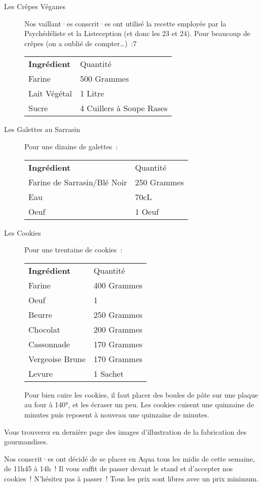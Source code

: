 \begin{description}
	\item[Les Crêpes Véganes] Nos vaillant·es conscrit·es ont utilisé la recette employée par la Psychédéliste et la Listeception (et donc les \cof{} 23 et 24). Pour beaucoup de crêpes (on a oublié de compter\dots)~:7

		\begin{tabular}{ll}
			\bf Ingrédient & Quantité\\
			Farine & 500 Grammes\\
			Lait Végétal & 1 Litre\\
			Sucre & 4 Cuillers à Soupe Rases\\
		\end{tabular}

	\item[Les Galettes au Sarrasin] Pour une dizaine de galettes~: 

		\begin{tabular}{ll}
			\bf Ingrédient & Quantité\\
			Farine de Sarrasin/Blé Noir & 250 Grammes\\
			Eau & 70cL\\
			Oeuf & 1 Oeuf\\
		\end{tabular}

	\item[Les Cookies] Pour une trentaine de cookies~:

		\begin{tabular}{ll}
			\bf Ingrédient & Quantité\\
			Farine & 400 Grammes\\
			Oeuf & 1\\
			Beurre & 250 Grammes\\
			Chocolat & 200 Grammes\\
			Cassonnade & 170 Grammes\\
			Vergeoise Brune & 170 Grammes\\
			Levure & 1 Sachet\\
		\end{tabular}
	Pour bien cuire les cookies, il faut placer des boules de pâte sur une plaque au four à 140°, et les écraser un peu. Les cookies cuisent une quinzaine de minutes puis reposent à nouveau une quinzaine de minutes.
\end{description}

Vous trouverez en dernière page des images d'illustration de la fabrication des gourmandises.

Nos conscrit·es ont décidé de se placer en Aqua tous les midis de cette semaine, de 11h45 à 14h~!
Il vous suffit de passer devant le stand et d'accepter nos cookies~! N'hésitez pas à passer~! Tous les prix sont libres avec un prix minimum.

\signature{Pandada, pour les conscrit·es du DI}
